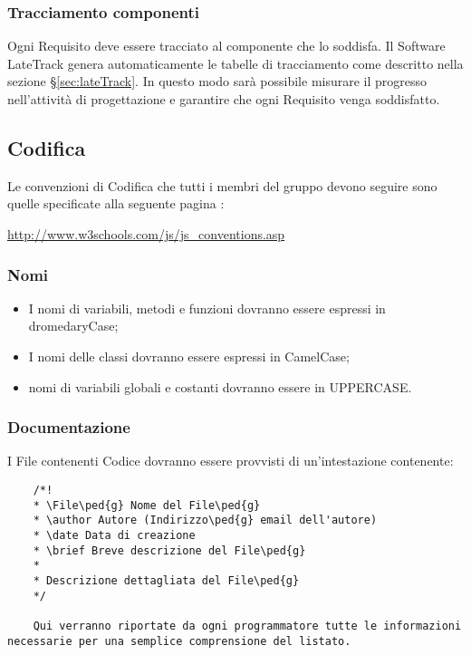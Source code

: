 	\subsubsection{Tracciamento componenti}
	Ogni Requisito deve essere tracciato al componente che lo soddisfa. Il Software LateTrack genera automaticamente le tabelle di tracciamento come descritto nella sezione \S\ref{sec:lateTrack}. In questo modo sarà possibile misurare il progresso nell'attività di progettazione e garantire che ogni Requisito venga soddisfatto.
	\subsection{Codifica}
	Le convenzioni di Codifica che tutti i membri del gruppo devono seguire sono quelle
	specificate alla seguente pagina :\\
	\begin{center} \url{http://www.w3schools.com/js/js_conventions.asp} \end{center}
	\subsubsection{Nomi}
	\begin{itemize}
	\item I nomi di variabili, metodi e funzioni dovranno essere espressi in dromedaryCase;
	\item I nomi delle classi dovranno essere espressi in CamelCase;
	\item nomi di variabili globali e costanti dovranno essere in UPPERCASE.
	\end{itemize}
	\subsubsection{Documentazione}
	I File contenenti Codice dovranno essere provvisti di un'intestazione contenente:
	\begin{lstlisting}
    /*!
  	* \File\ped{g} Nome del File\ped{g}
  	* \author Autore (Indirizzo\ped{g} email dell'autore)
  	* \date Data di creazione
  	* \brief Breve descrizione del File\ped{g}
  	*
  	* Descrizione dettagliata del File\ped{g}
  	*/
  	
  	Qui verranno riportate da ogni programmatore tutte le informazioni necessarie per una semplice comprensione del listato.
    
    \end{lstlisting}
   
